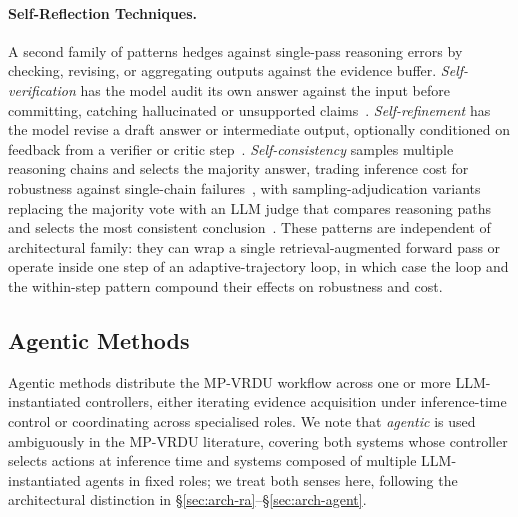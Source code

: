 \documentclass[11pt]{article}
\begin{document}
\paragraph{Self-Reflection Techniques.} A second family of patterns hedges against single-pass reasoning errors by checking, revising, or aggregating outputs against the evidence buffer. \textit{Self-verification} has the model audit its own answer against the input before committing, catching hallucinated or unsupported claims~\cite{jain2025simpledoc,yu2025mact}. \textit{Self-refinement} has the model revise a draft answer or intermediate output, optionally conditioned on feedback from a verifier or critic step~\cite{jain2025simpledoc,wang2025vidorag}. \textit{Self-consistency} samples multiple reasoning chains and selects the majority answer, trading inference cost for robustness against single-chain failures~\cite{yu2025mact}, with sampling-adjudication variants replacing the majority vote with an LLM judge that compares reasoning paths and selects the most consistent conclusion~\cite{zhu2025doclens}. These patterns are independent of architectural family: they can wrap a single retrieval-augmented forward pass or operate inside one step of an adaptive-trajectory loop, in which case the loop and the within-step pattern compound their effects on robustness and cost.

\subsection{Agentic Methods} 
\label{sec:tf-agentic} 
Agentic methods distribute the MP-VRDU workflow across one or more LLM-instantiated controllers, either iterating evidence acquisition under inference-time control or coordinating across specialised roles. We note that \textit{agentic} is used ambiguously in the MP-VRDU literature, covering both systems whose controller selects actions at inference time and systems composed of multiple LLM-instantiated agents in fixed roles; we treat both senses here, following the architectural distinction in \S\ref{sec:arch-ra}--\S\ref{sec:arch-agent}.
\end{document}

